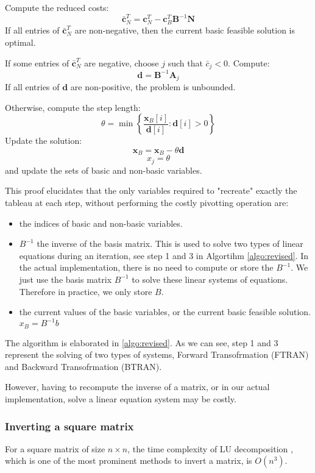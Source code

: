 Compute the reduced costs:
\[ \bar{\mathbf{c}}_N^T = \mathbf{c}_N^T - \mathbf{c}_B^T \mathbf{B}^{-1} \mathbf{N} \]
If all entries of \( \bar{\mathbf{c}}_N^T \) are non-negative,
then the current basic feasible solution is optimal.

If some entries of \( \bar{\mathbf{c}}_N^T \) are negative,
choose \( j \) such that \( \bar{c}_j < 0 \). Compute:
\[ \mathbf{d} = \mathbf{B}^{-1} \mathbf{A}_j \]
If all entries of \( \mathbf{d} \) are non-positive, the problem is unbounded.

Otherwise, compute the step length:
\[ \theta = \min \left\{ \frac{\mathbf{x}_B[i]}{\mathbf{d}[i]} : \mathbf{d}[i] > 0 \right\} \]
Update the solution:
\[ \mathbf{x}_B = \mathbf{x}_B - \theta \mathbf{d} \]
\[ x_j = \theta \]
and update the sets of basic and non-basic variables.

This proof elucidates that the only variables required to "recreate" exactly the tableau at
each step, without performing the costly pivotting operation are:
\begin{itemize}
    \item the indices of basic and non-basic variables.
    \item $B^{-1}$ the inverse of the basis matrix. This is used to solve two types of linear equations
          during an iteration, see step 1 and 3 in Algortihm \ref{algo:revised}.
          In the actual implementation, there is no need to compute or store the $B^{-1}$.
          We just use the basis matrix $B^{-1}$ to solve these linear systems of
          equations. Therefore in practice, we only store $B$.
    \item the current values of the basic variables, or the current basic feasible solution. $x_B = B^{-1}b$
\end{itemize}

The algorithm is elaborated in \ref{algo:revised}. As we can see, step 1 and 3 represent the solving of two types of systems, Forward Transofrmation (FTRAN) and Backward Transofrmation (BTRAN).

However, having to recompute the inverse of a matrix, or in our actual
implementation, solve a linear equation system may be costly.

\subsubsection{Inverting a square matrix}
For a square matrix of size \(n \times n\), the time complexity of LU
decomposition
\parencite{golub2013matrix},
which is one of the
most prominent methods to invert a matrix, is $O(n^3) $.

